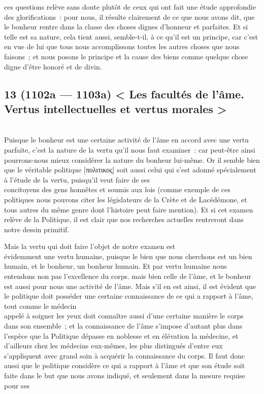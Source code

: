 \documentclass[french,twoside]{book} %
\begin{document}
ces questions relève sans doute plutôt de ceux qui ont fait une étude approfondie des glorifications : pour nous, il résulte  clairement de ce que nous avons dit, que le bonheur rentre dans la classe des choses dignes d’honneur et parfaites. Et si telle est sa nature, cela tient aussi, semble-t-il, à ce qu’il est un principe, car c’est en vue de lui que tous nous accomplissons toutes les autres choses que nous faisons ; et nous posons le principe et la cause des biens comme quelque chose digne d’être honoré et de divin.
\subsection[{13 (1102a — 1103a) < Les facultés de l’âme. Vertus intellectuelles et vertus morales >}]{13 (1102a — 1103a) < Les facultés de l’âme. Vertus intellectuelles et vertus morales >}
\noindent \\
Puisque le bonheur est une certaine activité de l’âme en accord avec une vertu parfaite, c’est la nature de la vertu qu’il nous faut examiner : car peut-être ainsi pourrons-nous mieux considérer la nature du bonheur lui-même. Or il semble bien que le véritable politique [πολιτικος] soit aussi celui qui s’est adonné spécialement à l’étude de la vertu, puisqu’il veut faire de ses \\
concitoyens des gens honnêtes et soumis aux lois (comme exemple de ces politiques nous pouvons citer les législateurs de la Crète et de Lacédémone, et tous autres du même genre dont l’histoire peut faire mention). Et si cet examen relève de la Politique, il est clair que nos recherches actuelles rentreront dans notre dessin primitif.\par
Mais la vertu qui doit faire l’objet de notre examen est \\
évidemment une vertu humaine, puisque le bien que nous cherchons est un bien humain, et le bonheur, un bonheur humain. Et par vertu humaine nous entendons non pas l’excellence du corps. mais bien celle de l’âme, et le bonheur est aussi pour nous une activité de l’âme. Mais s’il en est ainsi, il est évident que le politique doit posséder une certaine connaissance de ce qui a rapport à l’âme, tout comme le médecin \\
appelé à soigner les yeux doit connaître aussi d’une certaine manière le corps dans son ensemble ; et la connaissance de l’âme s’impose d’autant plus dans l’espèce que la Politique dépasse en noblesse et en élévation la médecine, et d’ailleurs chez les médecins eux-mêmes, les plus distingués d’entre eux s’appliquent avec grand soin à acquérir la connaissance du corps. Il faut donc aussi que le politique considère ce qui a rapport à l’âme et que son étude soit faite dans le but que nous avons indiqué, et seulement dans la mesure requise pour ses \\
\end{document}
